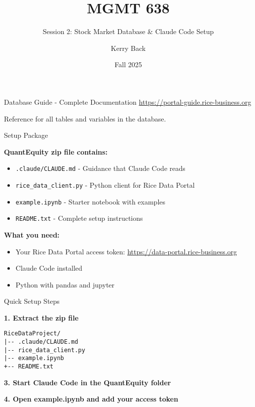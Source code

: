 \documentclass[aspectratio=169]{beamer}
\title{MGMT 638}
\subtitle{Session 2: Stock Market Database \& Claude Code Setup}
\author{Kerry Back}
\institute{}
\date{Fall 2025}
\begin{document}
\maketitle


\begin{frame}{Database Guide - Complete Documentation}
\centering
\Large
\url{https://portal-guide.rice-business.org}

\vspace{2em}

\normalsize
Reference for all tables and variables in the database.
\end{frame}

\begin{frame}{Setup Package}

\textbf{QuantEquity zip file contains:}

\begin{itemize}
    \item \texttt{.claude/CLAUDE.md} - Guidance that Claude Code reads
    \item \texttt{rice\_data\_client.py} - Python client for Rice Data Portal
    \item \texttt{example.ipynb} - Starter notebook with examples
    \item \texttt{README.txt} - Complete setup instructions
\end{itemize}

\vspace{1em}

\textbf{What you need:}
\begin{itemize}
    \item Your Rice Data Portal access token: \url{https://data-portal.rice-business.org}
    \item Claude Code installed
    \item Python with pandas and jupyter
\end{itemize}

\end{frame}



\begin{frame}[fragile]{Quick Setup Steps}

\textbf{1. Extract the zip file}
\begin{verbatim}
RiceDataProject/
|-- .claude/CLAUDE.md
|-- rice_data_client.py
|-- example.ipynb
+-- README.txt
\end{verbatim}



\textbf{3. Start Claude Code in the QuantEquity folder}

\textbf{4. Open example.ipynb and add your access token}

\end{frame}
\end{document}
